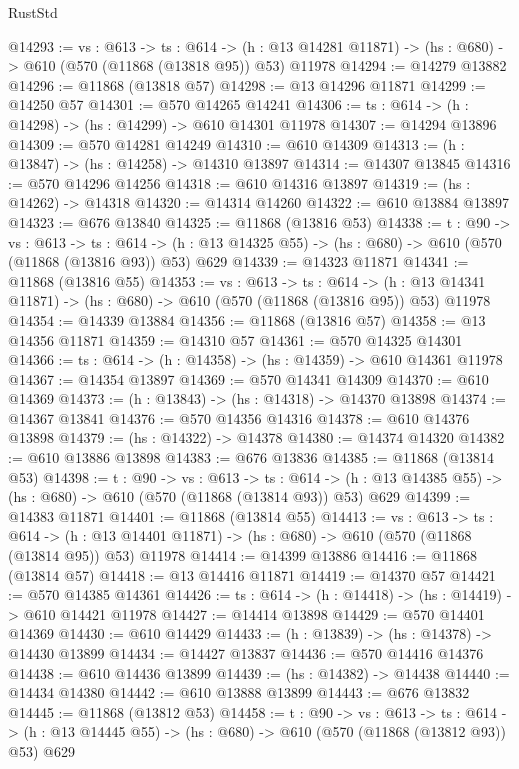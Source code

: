 \begin{lexlean}{RustStd}
\begin{coremodule}
@14293 := {vs : @613} ->
  {ts : @614} ->
  (h : @13 @14281 @11871) -> (hs : @680) -> @610 (@570 (@11868 (@13818 @95)) @53) @11978
@14294 := @14279 @13882
@14296 := @11868 (@13818 @57)
@14298 := @13 @14296 @11871
@14299 := @14250 @57
@14301 := @570 @14265 @14241
@14306 := {ts : @614} -> (h : @14298) -> (hs : @14299) -> @610 @14301 @11978
@14307 := @14294 @13896
@14309 := @570 @14281 @14249
@14310 := @610 @14309
@14313 := (h : @13847) -> (hs : @14258) -> @14310 @13897
@14314 := @14307 @13845
@14316 := @570 @14296 @14256
@14318 := @610 @14316 @13897
@14319 := (hs : @14262) -> @14318
@14320 := @14314 @14260
@14322 := @610 @13884 @13897
@14323 := @676 @13840
@14325 := @11868 (@13816 @53)
@14338 := {t : @90} ->
  {vs : @613} ->
  {ts : @614} -> (h : @13 @14325 @55) -> (hs : @680) -> @610 (@570 (@11868 (@13816 @93)) @53) @629
@14339 := @14323 @11871
@14341 := @11868 (@13816 @55)
@14353 := {vs : @613} ->
  {ts : @614} ->
  (h : @13 @14341 @11871) -> (hs : @680) -> @610 (@570 (@11868 (@13816 @95)) @53) @11978
@14354 := @14339 @13884
@14356 := @11868 (@13816 @57)
@14358 := @13 @14356 @11871
@14359 := @14310 @57
@14361 := @570 @14325 @14301
@14366 := {ts : @614} -> (h : @14358) -> (hs : @14359) -> @610 @14361 @11978
@14367 := @14354 @13897
@14369 := @570 @14341 @14309
@14370 := @610 @14369
@14373 := (h : @13843) -> (hs : @14318) -> @14370 @13898
@14374 := @14367 @13841
@14376 := @570 @14356 @14316
@14378 := @610 @14376 @13898
@14379 := (hs : @14322) -> @14378
@14380 := @14374 @14320
@14382 := @610 @13886 @13898
@14383 := @676 @13836
@14385 := @11868 (@13814 @53)
@14398 := {t : @90} ->
  {vs : @613} ->
  {ts : @614} -> (h : @13 @14385 @55) -> (hs : @680) -> @610 (@570 (@11868 (@13814 @93)) @53) @629
@14399 := @14383 @11871
@14401 := @11868 (@13814 @55)
@14413 := {vs : @613} ->
  {ts : @614} ->
  (h : @13 @14401 @11871) -> (hs : @680) -> @610 (@570 (@11868 (@13814 @95)) @53) @11978
@14414 := @14399 @13886
@14416 := @11868 (@13814 @57)
@14418 := @13 @14416 @11871
@14419 := @14370 @57
@14421 := @570 @14385 @14361
@14426 := {ts : @614} -> (h : @14418) -> (hs : @14419) -> @610 @14421 @11978
@14427 := @14414 @13898
@14429 := @570 @14401 @14369
@14430 := @610 @14429
@14433 := (h : @13839) -> (hs : @14378) -> @14430 @13899
@14434 := @14427 @13837
@14436 := @570 @14416 @14376
@14438 := @610 @14436 @13899
@14439 := (hs : @14382) -> @14438
@14440 := @14434 @14380
@14442 := @610 @13888 @13899
@14443 := @676 @13832
@14445 := @11868 (@13812 @53)
@14458 := {t : @90} ->
  {vs : @613} ->
  {ts : @614} -> (h : @13 @14445 @55) -> (hs : @680) -> @610 (@570 (@11868 (@13812 @93)) @53) @629

\end{coremodule}
\end{lexlean}
